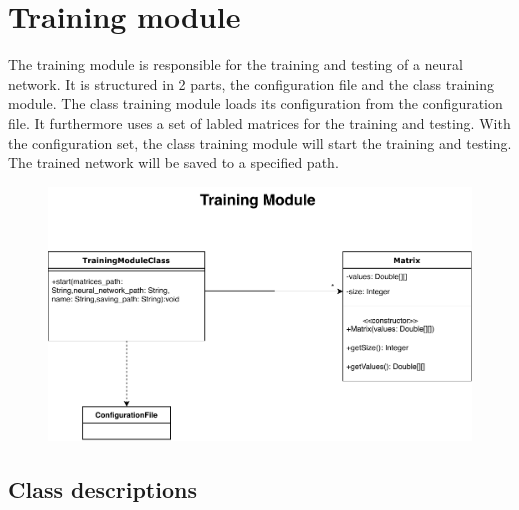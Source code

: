 \documentclass[parskip=full]{scrartcl}
\begin{document}
\section{Training module}
The training module is responsible for the training and testing of a \gls{neural network}.
It is structured in 2 parts, the configuration file and the class training module.
The class training module loads its configuration from the configuration file.
It furthermore uses a set of labled matrices for the training and testing.
With the configuration set, the class training module will start the training and testing.
The trained network will be saved to a specified path.
%
\begin{figure}[h]
\begin{center}
\includegraphics{ClassDiagrams/PDF/TrainingModule_classdiagram.pdf}
\label{Activity Diagrams}
\end{center}
\end{figure}

\subsection{Class descriptions}
\end{document}
